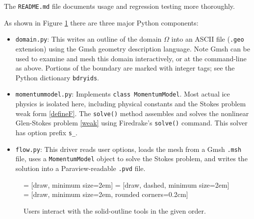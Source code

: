 \documentclass[letterpaper,final,12pt,reqno]{amsart}
\begin{document}
\medskip
\noindent The \verb|README.md| file documents usage and regression testing more thoroughly.

\medskip
As shown in Figure \ref{fig:blockdiagram} there are three major Python components:
\begin{itemize}
\item \texttt{domain.py}: \quad  This writes an outline of the domain $\Omega$ into an ASCII file (\texttt{.geo} extension) using the Gmsh \cite{GeuzaineRemacle2009} geometry description language.  Note Gmsh can be used to examine and mesh this domain interactively, or at the command-line as above.  Portions of the boundary are marked with integer tags; see the Python dictionary \texttt{bdryids}.

\item \texttt{momentummodel.py}: \quad  Implements \texttt{class MomentumModel}.  Most actual ice physics is isolated here, including physical constants and the Stokes problem weak form \eqref{defineF}.  The \texttt{solve()} method assembles and solves the nonlinear Glen-Stokes problem \eqref{weak} using Firedrake's \texttt{solve()} command.  This solver has option prefix \texttt{s\_}.

\item \texttt{flow.py}: \quad  This driver reads user options, loads the mesh from a Gmsh \texttt{.msh} file, uses a \texttt{MomentumModel} object to solve the Stokes problem, and writes the solution into a Paraview-readable \texttt{.pvd} file.
\end{itemize}

\begin{figure}[h]
\bigskip
{} = [draw, minimum size=2em]
 = [draw, dashed, minimum size=2em]
 = [draw, minimum size=2em, rounded corners=0.2cm]

\medskip
\caption{Users interact with the solid-outline tools in the given order.}
\label{fig:blockdiagram}
\end{figure}


\small

\bigskip


\end{document}

